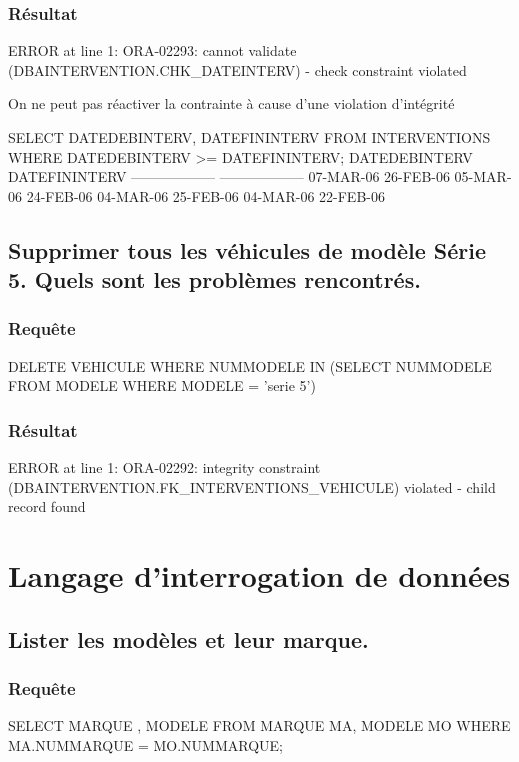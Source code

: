 \documentclass[•]{article}
\begin{document}
\begin{enumerate}
    \subsubsection{Résultat}
    \begin{sql}
    ERROR at line 1:
    ORA-02293: cannot validate (DBAINTERVENTION.CHK_DATEINTERV) - check constraint violated     
\end{sql}
On ne peut pas réactiver la contrainte à cause d'une violation d'intégrité
\begin{sql}
SELECT DATEDEBINTERV, DATEFININTERV FROM INTERVENTIONS WHERE DATEDEBINTERV >= DATEFININTERV;
DATEDEBINTERV      DATEFININTERV
------------------ ------------------
07-MAR-06          26-FEB-06
05-MAR-06          24-FEB-06
04-MAR-06          25-FEB-06
04-MAR-06          22-FEB-06
\end{sql}
\end{enumerate}

\subsection{Supprimer tous les véhicules de modèle Série 5. Quels sont les problèmes rencontrés.}
\subsubsection{Requête}
\begin{sql}
DELETE VEHICULE WHERE NUMMODELE IN (SELECT NUMMODELE FROM MODELE WHERE MODELE = 'serie 5')
\end{sql}
\subsubsection{Résultat}
\begin{sql}
ERROR at line 1:
ORA-02292: integrity constraint (DBAINTERVENTION.FK_INTERVENTIONS_VEHICULE) violated -
child record found 
\end{sql}
\section{Langage d’interrogation de données}
\subsection{Lister les modèles et leur marque.}
\subsubsection{Requête}
\begin{sql}
SELECT MARQUE , MODELE FROM MARQUE MA, MODELE MO WHERE MA.NUMMARQUE = MO.NUMMARQUE;\end{sql}
\end{document}
